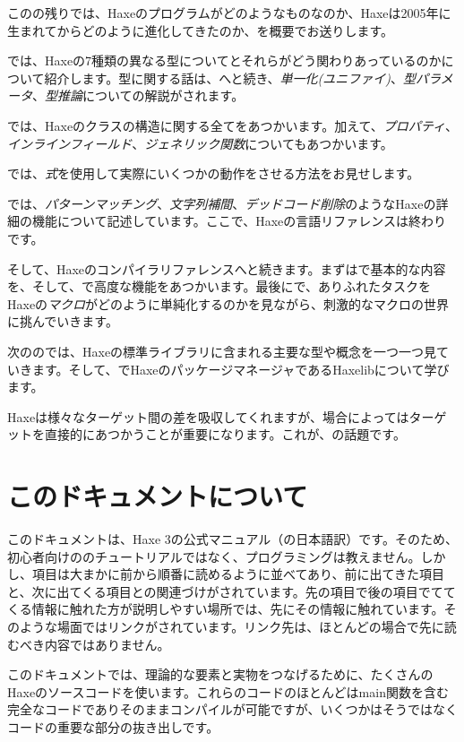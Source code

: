 このの残りでは、Haxeのプログラムがどのようなものなのか、Haxeは2005年に生まれてからどのように進化してきたのか、を概要でお送りします。

では、Haxeの7種類の異なる型についてとそれらがどう関わりあっているのかについて紹介します。型に関する話は、へと続き、\emph{単一化(ユニファイ)}、\emph{型パラメータ}、\emph{型推論}についての解説がされます。

では、Haxeのクラスの構造に関する全てをあつかいます。加えて、\emph{プロパティ}、\emph{インラインフィールド}、\emph{ジェネリック関数}についてもあつかいます。

では、\emph{式}を使用して実際にいくつかの動作をさせる方法をお見せします。

では、\emph{パターンマッチング}、\emph{文字列補間}、\emph{デッドコード削除}のようなHaxeの詳細の機能について記述しています。ここで、Haxeの言語リファレンスは終わりです。

そして、Haxeのコンパイラリファレンスへと続きます。まずはで基本的な内容を、そして、で高度な機能をあつかいます。最後にで、ありふれたタスクをHaxeの\emph{マクロ}がどのように単純化するのかを見ながら、刺激的なマクロの世界に挑んでいきます。

次ののでは、Haxeの標準ライブラリに含まれる主要な型や概念を一つ一つ見ていきます。そして、でHaxeのパッケージマネージャであるHaxelibについて学びます。

Haxeは様々なターゲット間の差を吸収してくれますが、場合によってはターゲットを直接的にあつかうことが重要になります。これが、の話題です。

\section{このドキュメントについて}
\label{introduction-about-this-document}

このドキュメントは、Haxe 3の公式マニュアル（の日本語訳）です。そのため、初心者向けののチュートリアルではなく、プログラミングは教えません。しかし、項目は大まかに前から順番に読めるように並べてあり、前に出てきた項目と、次に出てくる項目との関連づけがされています。先の項目で後の項目でててくる情報に触れた方が説明しやすい場所では、先にその情報に触れています。そのような場面ではリンクがされています。リンク先は、ほとんどの場合で先に読むべき内容ではありません。

このドキュメントでは、理論的な要素と実物をつなげるために、たくさんのHaxeのソースコードを使います。これらのコードのほとんどはmain関数を含む完全なコードでありそのままコンパイルが可能ですが、いくつかはそうではなくコードの重要な部分の抜き出しです。

